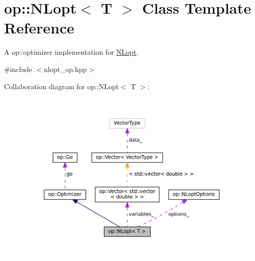 \hypertarget{classop_1_1NLopt}{\section{op\-:\-:N\-Lopt$<$ T $>$ Class Template Reference}
\label{classop_1_1NLopt}
}


A op\-::optimizer implementation for \hyperlink{classop_1_1NLopt}{N\-Lopt}.  




{\ttfamily \#include $<$nlopt\-\_\-op.\-hpp$>$}



Collaboration diagram for op\-:\-:N\-Lopt$<$ T $>$\-:
\nopagebreak
\begin{figure}[H]
\begin{center}
\leavevmode
\includegraphics[width=350pt]{classop_1_1NLopt__coll__graph}
\end{center}
\end{figure}
